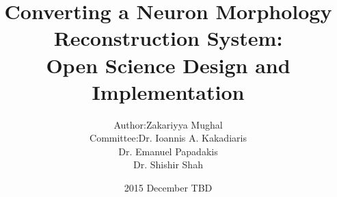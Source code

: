 \title[Converting a Neuron Morphology Reconstruction System: Open Science Design and Implementation]
{Converting a Neuron Morphology Reconstruction System:\\Open Science Design and Implementation}
\author[Zakariyya Mughal]{%
\begin{tabular}{r@{ }l}%
Author:    & Zakariyya Mughal \\[1ex]
Committee: & Dr. Ioannis A. Kakadiaris \\
           & Dr. Emanuel Papadakis \\
           & Dr. Shishir Shah
\end{tabular}%
}
\date{2015 December TBD}

